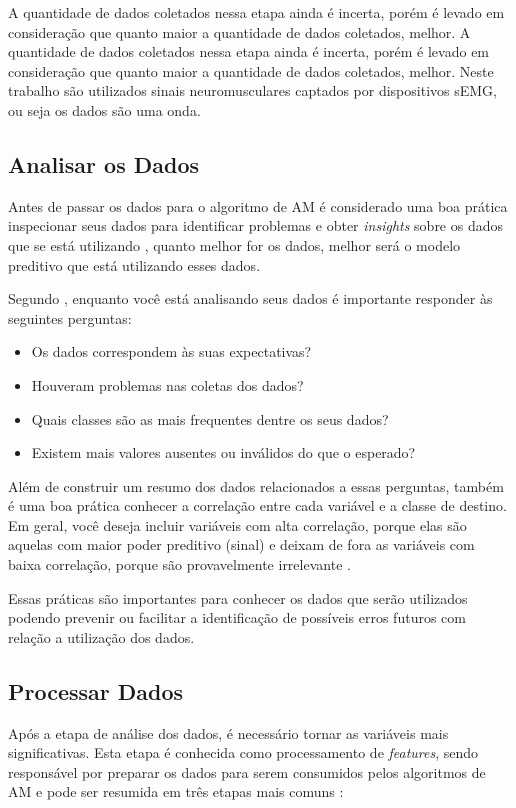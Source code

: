 A quantidade de dados coletados nessa etapa ainda é incerta, porém é levado em consideração que quanto maior a quantidade de dados coletados, melhor. A quantidade de dados coletados nessa etapa ainda é incerta, porém é levado em consideração que quanto maior a quantidade de dados coletados, melhor. Neste trabalho são utilizados sinais neuromusculares captados por dispositivos sEMG, ou seja os dados são uma onda.

\subsection{Analisar os Dados}

Antes de passar os dados para o algoritmo de AM é considerado uma boa prática inspecionar seus dados para identificar problemas e obter \textit{insights} sobre os dados que se está utilizando \cite{Amazon}, quanto melhor for os dados, melhor será o modelo preditivo que está utilizando esses dados.

Segundo , enquanto você está analisando seus dados é importante responder às seguintes perguntas:
\begin{itemize}
	\item Os dados correspondem às suas expectativas?
	\item Houveram problemas nas coletas dos dados?
	\item Quais classes são as mais frequentes dentre os seus dados?
	\item Existem mais valores ausentes ou inválidos do que o esperado?
\end{itemize}

Além de construir um resumo dos dados relacionados a essas perguntas, também é uma boa prática conhecer a correlação entre cada variável e a classe de destino. Em geral, você deseja incluir variáveis com alta correlação, porque elas são aquelas com maior poder preditivo (sinal) e deixam de fora as variáveis com baixa correlação, porque são provavelmente irrelevante \cite{Amazon}.

Essas práticas são importantes para conhecer os dados que serão utilizados podendo prevenir ou facilitar a identificação de possíveis erros futuros com relação a utilização dos dados.

\subsection{Processar Dados}

Após a etapa de análise dos dados, é necessário tornar as variáveis mais significativas. Esta etapa é conhecida como processamento de \textit{features}, sendo responsável por preparar os dados para serem consumidos pelos algoritmos de AM e pode ser resumida em três etapas mais comuns \cite{blum1997selection}:


